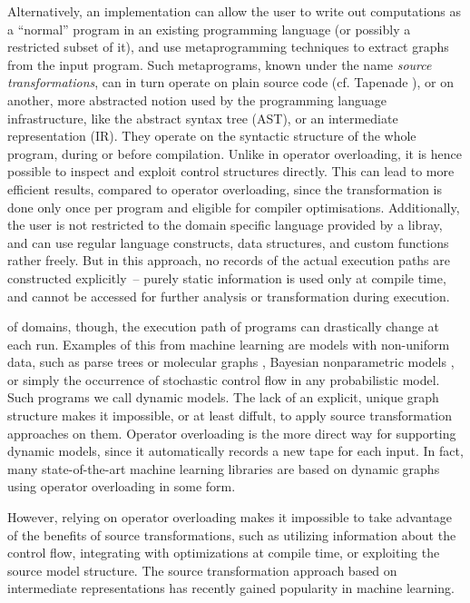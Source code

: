 Alternatively, an implementation can allow the user to write out computations as a \enquote{normal}
program in an existing programming language (or possibly a restricted subset of it), and use
metaprogramming techniques to extract graphs from the input program.  Such metaprograms, known under
the name \emph{source transformations}, can in turn operate on plain source code (cf. Tapenade
\parencite{tapenadedevelopers2019tapenade}), or on another, more abstracted notion used by the
programming language infrastructure, like the abstract syntax tree (AST), or an intermediate
representation (IR).  They operate on the syntactic structure of the whole program, during or before
compilation.  Unlike in operator overloading, it is hence possible to inspect and exploit control
structures directly. This can lead to more efficient results, compared to operator overloading,
since the transformation is done only once per program and eligible for compiler optimisations.
Additionally, the user is not restricted to the domain specific language provided by a libray, and
can use regular language constructs, data structures, and custom functions rather freely.  But in
this approach, no records of the actual execution paths are constructed explicitly~-- purely static
information is used only at compile time, and cannot be accessed for further analysis or
transformation during execution.

 of domains, though, the execution path of programs can drastically change
at each run.  Examples of this from machine learning are models with non-uniform data, such as parse
trees \parencite{socher2011parsing} or molecular graphs \parencite{bianucci2000application},
Bayesian nonparametric models \parencite{hjort2010bayesian}, or simply the occurrence of stochastic
control flow in any probabilistic model.  Such programs we call dynamic models.  The lack of an
explicit, unique graph structure makes it impossible, or at least diffult, to apply source
transformation approaches on them.  Operator overloading is the more direct way for supporting
dynamic models, since it automatically records a new tape for each input. In fact, many
state-of-the-art machine learning libraries are based on dynamic graphs using operator overloading
in some form.

However, relying on operator overloading makes it impossible to take advantage of the benefits of
source transformations, such as utilizing information about the control flow, integrating with
optimizations at compile time, or exploiting the source model structure.  The source transformation
approach based on intermediate representations has recently gained popularity in machine learning.



